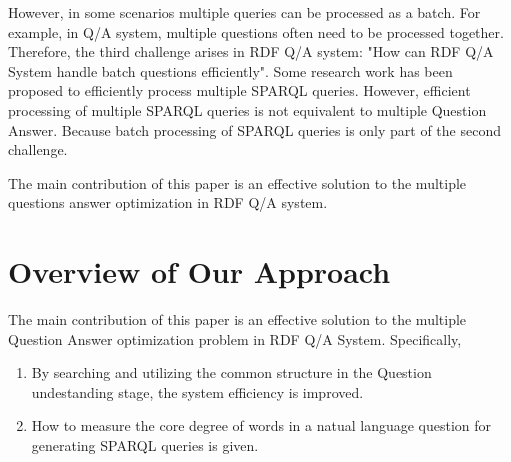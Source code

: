 \documentclass[runningheads]{llncs}
\begin{document}
However, in some scenarios multiple queries can be processed as a batch. For example, in Q/A system, multiple questions often need to be processed together. Therefore, the third challenge arises in RDF Q/A system: "How can RDF Q/A System handle batch questions efficiently". Some research work has been proposed to efficiently process multiple SPARQL queries\cite{junhu}. However, efficient processing of multiple SPARQL queries is not equivalent to multiple Question Answer. Because  batch processing of SPARQL queries is only part of the second challenge.

The main contribution of this paper is an effective solution to the multiple questions answer optimization in RDF Q/A system.

\section{Overview of Our Approach}
The main contribution of this paper is an effective solution to the multiple Question Answer optimization problem in RDF Q/A System. Specifically,
\begin{enumerate}
	\item By searching and utilizing the common structure in the Question undestanding stage, the system efficiency is improved.
	\item How to measure the core degree of words in a natual language question for generating SPARQL queries is given.
\end{enumerate}
\end{document}
